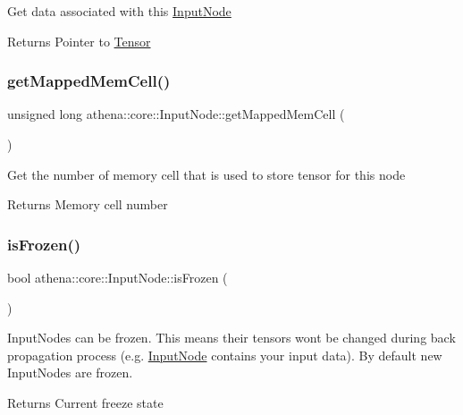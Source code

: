 Get data associated with this \mbox{\hyperlink{classathena_1_1core_1_1_input_node}{Input\+Node}} \begin{DoxyReturn}{Returns}
Pointer to \mbox{\hyperlink{classathena_1_1core_1_1_tensor}{Tensor}} 
\end{DoxyReturn}
\mbox{\label{classathena_1_1core_1_1_input_node_acebc0cbf077eaae99f5c11cfba608533}} 
\subsubsection{\texorpdfstring{get\+Mapped\+Mem\+Cell()}{getMappedMemCell()}}
{\footnotesize\ttfamily unsigned long athena\+::core\+::\+Input\+Node\+::get\+Mapped\+Mem\+Cell (\begin{DoxyParamCaption}{ }\end{DoxyParamCaption})}

Get the number of memory cell that is used to store tensor for this node \begin{DoxyReturn}{Returns}
Memory cell number 
\end{DoxyReturn}
\mbox{\label{classathena_1_1core_1_1_input_node_a4be7482bcf2e56ea3fd03a2bf79be074}} 
\subsubsection{\texorpdfstring{is\+Frozen()}{isFrozen()}}
{\footnotesize\ttfamily bool athena\+::core\+::\+Input\+Node\+::is\+Frozen (\begin{DoxyParamCaption}{ }\end{DoxyParamCaption})}

Input\+Nodes can be frozen. This means their tensors won\textquotesingle{}t be changed during back propagation process (e.\+g. \mbox{\hyperlink{classathena_1_1core_1_1_input_node}{Input\+Node}} contains your input data). By default new Input\+Nodes are frozen. \begin{DoxyReturn}{Returns}
Current freeze state 
\end{DoxyReturn}
\mbox{\label{classathena_1_1core_1_1_input_node_a2548b569a336b75c0005295833052979}} 
